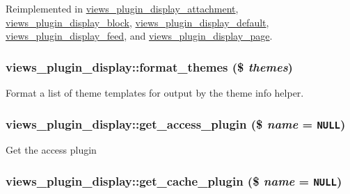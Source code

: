 Reimplemented in \hyperlink{classviews__plugin__display__attachment_5ca7a4fec7907cd236d0f73ac21f4e1e}{views\_\-plugin\_\-display\_\-attachment}, \hyperlink{classviews__plugin__display__block_d673f5b3462304a522ead4293a8f7cef}{views\_\-plugin\_\-display\_\-block}, \hyperlink{classviews__plugin__display__default_cceee9203c7f628f686147944442fecd}{views\_\-plugin\_\-display\_\-default}, \hyperlink{classviews__plugin__display__feed_6bfa566313f3f8fba85751554567e2dd}{views\_\-plugin\_\-display\_\-feed}, and \hyperlink{classviews__plugin__display__page_943b71fc873e5d09f548b69ba314b674}{views\_\-plugin\_\-display\_\-page}.\hypertarget{classviews__plugin__display_4f8fbb2ff9dd0f00e31a265334d840e0}{
\subsubsection[{format\_\-themes}]{\setlength{\rightskip}{0pt plus 5cm}views\_\-plugin\_\-display::format\_\-themes (\$ {\em themes})}}
\label{classviews__plugin__display_4f8fbb2ff9dd0f00e31a265334d840e0}


Format a list of theme templates for output by the theme info helper. \hypertarget{classviews__plugin__display_e39592a8c4f13e521fe9f5e7f8aa2296}{
\subsubsection[{get\_\-access\_\-plugin}]{\setlength{\rightskip}{0pt plus 5cm}views\_\-plugin\_\-display::get\_\-access\_\-plugin (\$ {\em name} = {\tt NULL})}}
\label{classviews__plugin__display_e39592a8c4f13e521fe9f5e7f8aa2296}


Get the access plugin \hypertarget{classviews__plugin__display_726c2caab760f24278e7745b06064d32}{
\subsubsection[{get\_\-cache\_\-plugin}]{\setlength{\rightskip}{0pt plus 5cm}views\_\-plugin\_\-display::get\_\-cache\_\-plugin (\$ {\em name} = {\tt NULL})}}
\label{classviews__plugin__display_726c2caab760f24278e7745b06064d32}


